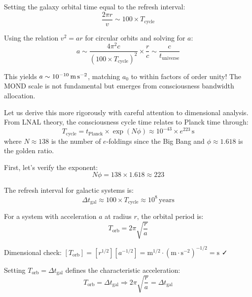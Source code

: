 \documentclass[twocolumn,prd,amsmath,amssymb,aps,superscriptaddress,nofootinbib]{revtex4-2}
\newcommand{\azero}{a_0}
\begin{document}
Setting the galaxy orbital time equal to the refresh interval:
\begin{equation}
\frac{2\pi r}{v} \sim 100 \times T_{\text{cycle}}
\end{equation}

Using the relation $v^2 = a r$ for circular orbits and solving for $a$:
\begin{equation}
a \sim \frac{4\pi^2 c}{(100 \times T_{\text{cycle}})^2} \times \frac{r}{c} \sim \frac{c}{t_{\text{universe}}}
\end{equation}

This yields $a \sim 10^{-10}\,\text{m\,s}^{-2}$, matching $\azero$ to within factors of order unity! The MOND scale is not fundamental but emerges from consciousness bandwidth allocation.

Let us derive this more rigorously with careful attention to dimensional analysis. From LNAL theory, the consciousness cycle time relates to Planck time through:
\begin{equation}
T_{\text{cycle}} = t_{\text{Planck}} \times \exp(N\phi) \approx 10^{-43} \times e^{223} \,\text{s}
\end{equation}
where $N \approx 138$ is the number of $e$-foldings since the Big Bang and $\phi \approx 1.618$ is the golden ratio.

First, let's verify the exponent:
\begin{equation}
N\phi = 138 \times 1.618 \approx 223
\end{equation}

The refresh interval for galactic systems is:
\begin{equation}
\Delta t_{\text{gal}} \approx 100 \times T_{\text{cycle}} \approx 10^8 \,\text{years}
\end{equation}

For a system with acceleration $a$ at radius $r$, the orbital period is:
\begin{equation}
T_{\text{orb}} = 2\pi\sqrt{\frac{r}{a}}
\end{equation}

Dimensional check: $[T_{\text{orb}}] = [r^{1/2}][a^{-1/2}] = \text{m}^{1/2} \cdot (\text{m}\cdot\text{s}^{-2})^{-1/2} = \text{s}$ ✓

Setting $T_{\text{orb}} = \Delta t_{\text{gal}}$ defines the characteristic acceleration:
\begin{equation}
T_{\text{orb}} = \Delta t_{\text{gal}} \Rightarrow 2\pi\sqrt{\frac{r}{a}} = \Delta t_{\text{gal}}
\end{equation}
\end{document}
